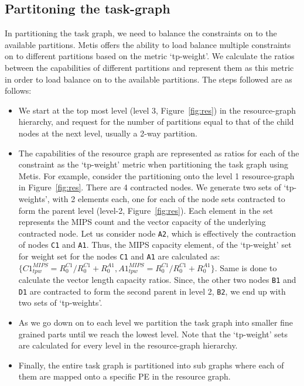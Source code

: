\subsection{Partitoning the task-graph}
\label{sec:part-task-graph}

In partitioning the task graph, we need to balance the constraints on to
the available partitions. Metis offers the ability to load balance
multiple constraints on to different partitions based on the metric
\mbox{`tp-weight'}. We calculate the ratios between the capabilities of
different partitions and represent them as this metric in order to load
balance on to the available partitions. The steps followed are as
follows:

\begin{itemize}

\item We start at the top most level (level 3, Figure~\ref{fig:res}) in
  the resource-graph hierarchy, and request for the number of partitions
  equal to that of the child nodes at the next level, usually a 2-way
  partition.

\item The capabilities of the resource graph are represented as ratios
  for each of the constraint as the `tp-weight' metric when partitioning
  the task graph using Metis. For example, consider the partitioning
  onto the level 1 resource-graph in Figure~\ref{fig:res}. There are 4
  contracted nodes. We generate two sets of `tp-weights', with 2
  elements each, one for each of the node sets contracted to form the
  parent level (level-2, Figure~\ref{fig:res}). Each element in the set
  represents the MIPS count and the vector capacity of the underlying
  contracted node. Let us consider node \texttt{A2}, which is
  effectively the contraction of nodes \texttt{C1} and
  \texttt{A1}. Thus, the MIPS capacity element, of the `tp-weight' set
  for weight set for the nodes \texttt{C1} and \texttt{A1} are
  calculated as: {$\{C1^{MIPS}_{tpw} = R^{C1}_0/R^{C1}_0 + R^{A1}_0,
    A1^{MIPS}_{tpw} = R^{C1}_0/R^{C1}_0 + R^{A1}_0\}$}. Same is done to
  calculate the vector length capacity ratios. Since, the other two
  nodes \texttt{B1} and \texttt{D1} are contracted to form the second
  parent in level 2, \texttt{B2}, we end up with two sets of
  `tp-weights'.

\item As we go down on to each level we partition the task graph into
  smaller fine grained parts until we reach the lowest level. Note that
  the `tp-weight' sets are calculated for every level in the
  resource-graph hierarchy.

\item Finally, the entire task graph is partitioned into sub graphs
  where each of them are mapped onto a specific PE in the resource
  graph.

\end{itemize}


